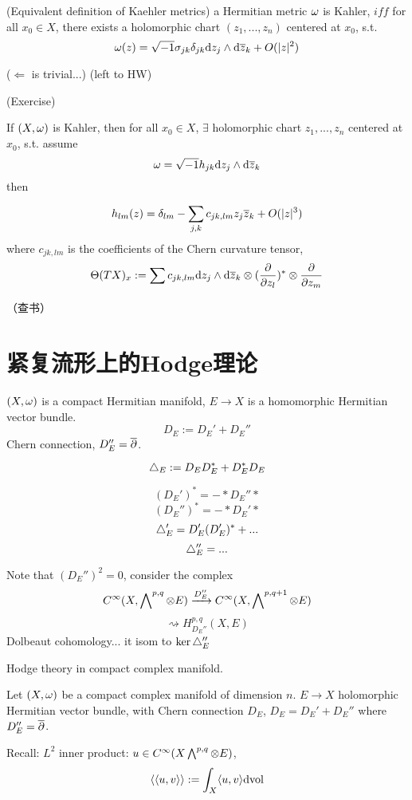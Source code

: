 \begin{prop}(Equivalent definition of Kaehler metrics)
a Hermitian metric $\omega$ is Kahler, $iff$
for all $x_0\in X$, there exists a holomorphic chart $(z_1,...,z_n)$
centered at $x_0$, s.t.
$$\omega(z)=\sqrt{-1}\sigma_{jk}\delta_{jk}\mathrm{d} z_j\wedge\mathrm{d}\overline{z}_k
+O(|z|^2)
$$
\end{prop}

($\Leftarrow$ is trivial...)
(left to HW)

\begin{thm}(Exercise)

If $(X,\omega)$ is Kahler, then for all $x_0\in X$,
$\exists$ holomorphic chart $z_1,...,z_n$ centered at $x_0$, s.t.
assume
$$\omega=\sqrt{-1}h_{jk}\mathrm{d} z_j\wedge\mathrm{d}\overline{z}_k$$
then

$$h_{lm}(z)=\delta_{lm}-\sum_{j,k}c_{jk,lm}z_j\overline{z}_k+O(|z|^3)$$
where $c_{jk,lm}$ is the coefficients of the Chern curvature tensor,
$$\Theta(TX)_{x}:=\sum c_{jk,lm}\mathrm{d} z_j\wedge\mathrm{d}\overline{z}_k\otimes(\frac{\partial } {\partial z_l})^*\otimes
\frac{\partial } {\partial z_m}$$
\end{thm}
（查书）

\section{紧复流形上的Hodge理论}

$(X,\omega)$ is a compact Hermitian manifold,
$E\to X$ is a homomorphic Hermitian vector bundle.
$$D_E:=D_E'+D_E''$$
Chern connection, $D_E''=\overline{\partial}$.

\begin{definition}
$$\triangle_E:=D_ED_E^*+D_E^*D_E$$
\end{definition}
$$(D_E')^*=-*D_E''*$$
$$(D_E'')^*=-*D_E'*$$
$$\triangle_E'=D_E'(D_E')^*+...$$
$$\triangle_E''=...$$

Note that $(D_E'')^2=0$, consider the complex
$$C^\infty(X,\bigwedge\nolimits^{p,q}\otimes E)\xrightarrow{D_E''}C^\infty(X,\bigwedge\nolimits^{p,q+1}\otimes E)$$
$$\rightsquigarrow H^{p,q}_{D_E''}(X,E)$$
Dolbeaut cohomology...
it isom to $\ker\triangle_E''$


Hodge theory in compact complex manifold.

Let $(X,\omega)$ be a compact complex manifold of dimension $n$.
$E\to X$ holomorphic Hermitian vector bundle, with Chern connection $D_E$,
$D_E=D_E'+D_E''$ where $D_E''=\overline{\partial}$.

Recall: $L^2$ inner product: $u\in C^\infty(X\bigwedge\nolimits^{p,q}\otimes E)$,
$$\langle\langle u,v\rangle\rangle:=
\int_X\langle u,v\rangle
\mathrm{d}\text{vol}
$$

